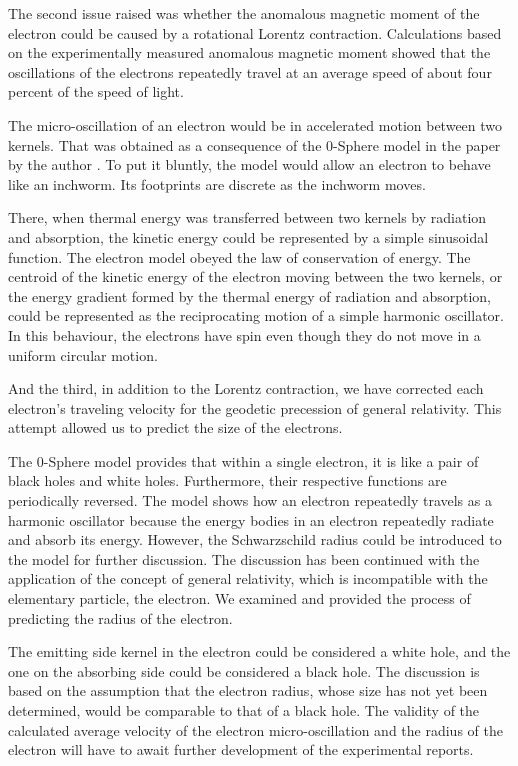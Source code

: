 \documentclass[10.5pt]{article}
\numberwithin{equation}{section}
\begin{document}
The second issue raised was whether the anomalous magnetic moment of the electron could be caused by a rotational Lorentz contraction. Calculations based on the experimentally measured anomalous magnetic moment showed that the oscillations of the electrons repeatedly travel at an average speed of about four percent of the speed of light.


The micro-oscillation of an electron would be in accelerated motion between two kernels. That was obtained as a consequence of the 0-Sphere model in the paper by the author \cite{Hanamura1}. To put it bluntly, the model would allow an electron to behave like an inchworm. Its footprints are discrete as the inchworm moves.

There, when thermal energy was transferred between two kernels by radiation and absorption, the kinetic energy could be represented by a simple sinusoidal function. The electron model obeyed the law of conservation of energy. The centroid of the kinetic energy of the electron moving between the two kernels, or the energy gradient formed by the thermal energy of radiation and absorption, could be represented as the reciprocating motion of a simple harmonic oscillator. In this behaviour, the electrons have spin even though they do not move in a uniform circular motion.


And the third, in addition to the Lorentz contraction, we have corrected each electron's traveling velocity for the geodetic precession of general relativity. This attempt allowed us to predict the size of the electrons.


The 0-Sphere model provides that within a single electron, it is like a pair of black holes and white holes. Furthermore, their respective functions are periodically reversed. The model shows how an electron repeatedly travels as a harmonic oscillator because the energy bodies in an electron repeatedly radiate and absorb its energy. However, the Schwarzschild radius could be introduced to the model for further discussion. The discussion has been continued with the application of the concept of general relativity, which is incompatible with the elementary particle, the electron. We examined and provided the process of predicting the radius of the electron.


The emitting side kernel in the electron could be considered a white hole, and the one on the absorbing side could be considered a black hole. The discussion is based on the assumption that the electron radius, whose size has not yet been determined, would be comparable to that of a black hole. The validity of the calculated  average velocity of the electron micro-oscillation and the radius of the electron will have to await further development of the experimental reports.
\end{document}
